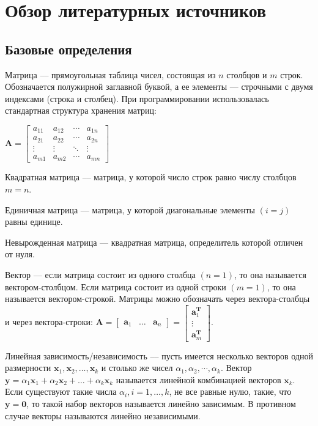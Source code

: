\newpage

\section{Обзор литературных источников}

\subsection{Базовые определения}

Матрица --– прямоугольная таблица чисел, состоящая из $ n $ столбцов и $ m $ строк. Обозначается полужирной заглавной буквой, а ее элементы --- строчными с двумя индексами (строка и столбец). При программировании использовалась стандартная структура хранения матриц:

$ \mathbf{A} = \left[ 
\begin{array}{cccc}
a_{11} & a_{12} & \cdots & a_{1n} \\
a_{21} & a_{22} & \cdots & a_{2n} \\
\vdots & \vdots & \ddots & \vdots \\
a_{m1} & a_{m2} & \cdots & a_{mn}
\end{array} \right] $

Квадратная матрица –-- матрица, у которой число строк равно числу столбцов $ m = n $.

Единичная матрица --– матрица, у которой диагональные элементы $ (i = j) $ равны единице.

Невырожденная матрица --– квадратная матрица, определитель которой отличен от нуля.

Вектор –-- если матрица состоит из одного столбца $ (n = 1) $, то она называется вектором-столбцом. Если матрица состоит из одной строки $ (m = 1) $, то она называется вектором-строкой. Матрицы можно обозначать через вектора-столбцы и через вектора-строки: $ \mathbf{A} = \left[ \begin{array}{cccc}
\mathbf{a}_1 & \ldots & \mathbf{a}_n 
\end{array} \right] = \left[ \begin{array}{cccc}
\mathbf{a}^\mathbf{T}_1 \\
\vdots \\
\mathbf{a}^\mathbf{T}_m
\end{array} \right] $.

Линейная зависимость/независимость –-- пусть имеется несколько векторов одной размерности $ \mathbf{x}_1, \mathbf{x}_2, \ldots ,\mathbf{x}_k $ и столько же чисел $ \alpha_1, \alpha_2, \cdots, \alpha_k $. Вектор $ \mathbf{y}=\alpha_1 \mathbf{x}_1 + \alpha_2 \mathbf{x}_2 + \ldots + \alpha_k \mathbf{x}_k $ называется линейной комбинацией векторов $ \mathbf{x}_k $. Если существуют такие числа $ \alpha_i, i=1, \ldots, k $, не все равные нулю, такие, что $ \mathbf{y}=\mathbf{0} $, то такой набор векторов называется линейно зависимым. В противном случае векторы называются линейно независимыми.


